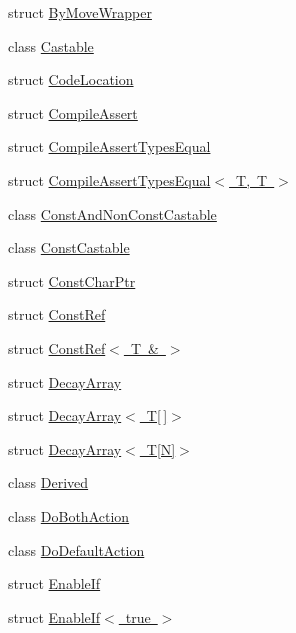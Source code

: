 \begin{DoxyCompactItemize}
struct \mbox{\hyperlink{structtesting_1_1internal_1_1ByMoveWrapper}{By\+Move\+Wrapper}}
\item 
class \mbox{\hyperlink{classtesting_1_1internal_1_1Castable}{Castable}}
\item 
struct \mbox{\hyperlink{structtesting_1_1internal_1_1CodeLocation}{Code\+Location}}
\item 
struct \mbox{\hyperlink{structtesting_1_1internal_1_1CompileAssert}{Compile\+Assert}}
\item 
struct \mbox{\hyperlink{structtesting_1_1internal_1_1CompileAssertTypesEqual}{Compile\+Assert\+Types\+Equal}}
\item 
struct \mbox{\hyperlink{structtesting_1_1internal_1_1CompileAssertTypesEqual_3_01T_00_01T_01_4}{Compile\+Assert\+Types\+Equal$<$ T, T $>$}}
\item 
class \mbox{\hyperlink{classtesting_1_1internal_1_1ConstAndNonConstCastable}{Const\+And\+Non\+Const\+Castable}}
\item 
class \mbox{\hyperlink{classtesting_1_1internal_1_1ConstCastable}{Const\+Castable}}
\item 
struct \mbox{\hyperlink{structtesting_1_1internal_1_1ConstCharPtr}{Const\+Char\+Ptr}}
\item 
struct \mbox{\hyperlink{structtesting_1_1internal_1_1ConstRef}{Const\+Ref}}
\item 
struct \mbox{\hyperlink{structtesting_1_1internal_1_1ConstRef_3_01T_01_6_01_4}{Const\+Ref$<$ T \& $>$}}
\item 
struct \mbox{\hyperlink{structtesting_1_1internal_1_1DecayArray}{Decay\+Array}}
\item 
struct \mbox{\hyperlink{structtesting_1_1internal_1_1DecayArray_3_01T[]_4}{Decay\+Array$<$ T\mbox{[}$\,$\mbox{]}$>$}}
\item 
struct \mbox{\hyperlink{structtesting_1_1internal_1_1DecayArray_3_01T[N]_4}{Decay\+Array$<$ T\mbox{[}\+N\mbox{]}$>$}}
\item 
class \mbox{\hyperlink{classtesting_1_1internal_1_1Derived}{Derived}}
\item 
class \mbox{\hyperlink{classtesting_1_1internal_1_1DoBothAction}{Do\+Both\+Action}}
\item 
class \mbox{\hyperlink{classtesting_1_1internal_1_1DoDefaultAction}{Do\+Default\+Action}}
\item 
struct \mbox{\hyperlink{structtesting_1_1internal_1_1EnableIf}{Enable\+If}}
\item 
struct \mbox{\hyperlink{structtesting_1_1internal_1_1EnableIf_3_01true_01_4}{Enable\+If$<$ true $>$}}

\end{DoxyCompactItemize}

